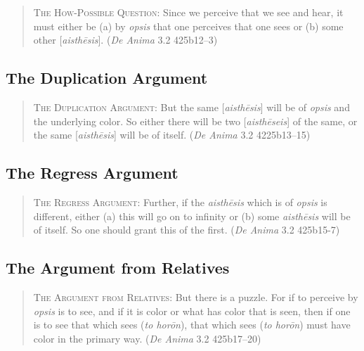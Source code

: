 \begin{quote}
	\textsc{The How-Possible Question}: Since we perceive that we see and hear, it must either be (a) by \emph{opsis} that one perceives that one sees or (b) some other [\emph{aisthēsis}]. (\emph{De Anima} 3.2 425b12–3)
\end{quote}


\subsection{The Duplication Argument} %
\label{sub:the_duplication_argument}

\begin{quote}
	\textsc{The Duplication Argument}: But the same [\emph{aisthēsis}] will be of \emph{opsis} and the underlying color. So either there will be two [\emph{aisthēseis}] of the same, or the same [\emph{aisthēsis}] will be of itself. (\emph{De Anima} 3.2 4225b13–15)
\end{quote}


\subsection{The Regress Argument} %
\label{sub:the_regress_argument}

\begin{quote}
	\textsc{The Regress Argument}: Further, if the \emph{aisthēsis} which is of \emph{opsis} is different, either (a) this will go on to infinity or (b) some \emph{aisthēsis} will be of itself. So one should grant this of the first. (\emph{De Anima} 3.2 425b15-7)
\end{quote}




\subsection{The Argument from Relatives} %
\label{sub:the_argument_from_relatives}

\begin{quote}
	\textsc{The Argument from Relatives}: But there is a puzzle. For if to perceive by \emph{opsis} is to see, and if it is color or what has color that is seen, then if one is to see that which sees (\emph{to horōn}), that which sees (\emph{to horōn}) must have color in the primary way. (\emph{De Anima} 3.2 425b17–20)
\end{quote}

